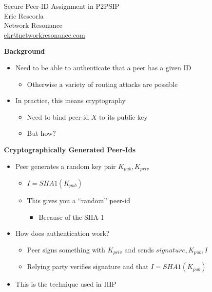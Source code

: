 \documentclass[helvetica]{seminar}
\newcommand{\heading}[1]{%
  \begin{center} 
    \large\bf 
    #1 
  \end{center} 
  \vspace{.4 in}}
\begin{document}
\begin{slide}
\begin{center}
\LARGE{{\bf}Secure Peer-ID Assignment in P2PSIP}\\

\vspace{.6 in}
\large{Eric Rescorla}\\
\large{Network Resonance}\\
\large{\url{ekr@networkresonance.com}}

\end{center}
\end{slide}



\begin{slide}
\heading{Background}

\begin{itemize}
\item Need to be able to authenticate that a peer has a given ID
\begin{itemize}
\item Otherwise a variety of routing attacks are possible
\end{itemize}
\item In practice, this means cryptography
\begin{itemize}
\item Need to bind peer-id $X$ to its public key
\item But how?
\end{itemize}

\end{itemize}
\end{slide}


\begin{slide}
\heading{Cryptographically Generated Peer-Ids}

\begin{itemize}
\item Peer generates a random key pair $K_{pub}, K_{priv}$
\begin{itemize}
\item $I = SHA1(K_{pub})$
\item This gives you a ``random'' peer-id
\begin{itemize}
\item Because of the SHA-1
\end{itemize}
\end{itemize}
\item How does authentication work?
\begin{itemize}
\item Peer signs something with $K_{priv}$ and sends $signature, K_{pub}, I$
\item Relying party verifies signature and that  $I = SHA1(K_{pub})$
\end{itemize}
\item This is the technique used in HIP
\end{itemize}
\end{slide}
\end{document}
